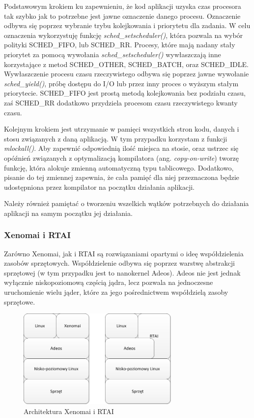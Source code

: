 Podstawowym krokiem ku zapewnieniu, że kod aplikacji uzyska czas procesora tak szybko jak to potrzebne jest jawne oznaczenie danego procesu. Oznaczenie odbywa się poprzez wybranie trybu kolejkowania i priorytetu dla zadania. W celu oznaczenia wykorzystuję funkcję \emph{sched\_setscheduler()}, która pozwala na wybór polityki SCHED\_FIFO, lub SCHED\_RR. Procesy, które mają nadany stały priorytet za pomocą wywołania \emph{sched\_setscheduler()} wywłaszczają inne korzystające z metod SCHED\_OTHER, SCHED\_BATCH, oraz SCHED\_IDLE. Wywłaszczenie procesu czasu rzeczywistego odbywa się poprzez jawne wywołanie \emph{sched\_yield()}, próbę dostępu do I/O lub przez inny proces o wyższym stałym priorytecie. SCHED\_FIFO jest prostą metodą kolejkowania bez podziału czasu, zaś SCHED\_RR dodatkowo przydziela procesom czasu rzeczywistego kwanty czasu. 

Kolejnym krokiem jest utrzymanie w pamięci wszystkich stron kodu, danych i stosu związanych z daną aplikacją. W tym przypadku korzystam z funkcji \emph{mlockall()}. Aby zapewnić odpowiednią ilość miejsca na stosie, oraz ustrzec się opóźnień związanych z optymalizacją kompilatora (ang. \emph{copy-on-write}) tworzę funkcję, która alokuje zmienną automatyczną typu tablicowego. Dodatkowo, pisanie do tej zmiennej zapewnia, że cała pamięć dla niej przeznaczona będzie udostępniona przez kompilator na początku działania aplikacji.

Należy również pamiętać o tworzeniu wszelkich wątków potrzebnych do działania aplikacji na samym początku jej działania.

\subsubsection{Xenomai i RTAI}

Zarówno Xenomai, jak i RTAI są rozwiązaniami opartymi o ideę współdzielenia zasobów sprzętowych. Współdzielenie odbywa się poprzez warstwę abstrakcji sprzętowej (w tym przypadku jest to nanokernel Adeos). Adeos nie jest jednak wyłącznie niskopoziomową częścią jądra, lecz pozwala na jednoczesne uruchomienie wielu jąder, które za jego pośrednictwem współdzielą zasoby sprzętowe. 

\begin{figure}[htb]
\begin{center}
\includegraphics[width=300px]{img/XenomaiRTAI}
\caption{Architektura Xenomai i RTAI}
\label{XenomaiRTAI}
\end{center}
\end{figure}

